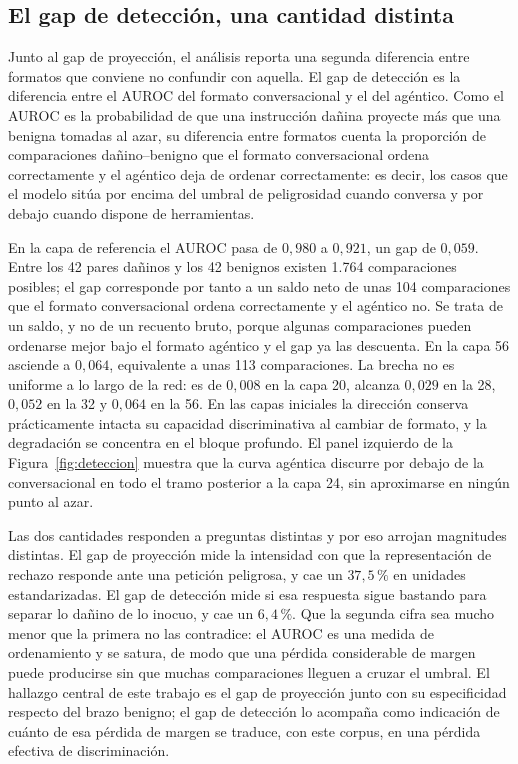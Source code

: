\documentclass[12pt,a4paper]{article}
\begin{document}
\subsection{El gap de detección, una cantidad distinta}

\justifying

Junto al gap de proyección, el análisis reporta una segunda diferencia entre formatos que conviene no confundir con aquella. El gap de detección es la diferencia entre el AUROC del formato conversacional y el del agéntico. Como el AUROC es la probabilidad de que una instrucción dañina proyecte más que una benigna tomadas al azar, su diferencia entre formatos cuenta la proporción de comparaciones dañino--benigno que el formato conversacional ordena correctamente y el agéntico deja de ordenar correctamente: es decir, los casos que el modelo sitúa por encima del umbral de peligrosidad cuando conversa y por debajo cuando dispone de herramientas.

En la capa de referencia el AUROC pasa de $0{,}980$ a $0{,}921$, un gap de $0{,}059$. Entre los 42 pares dañinos y los 42 benignos existen 1.764 comparaciones posibles; el gap corresponde por tanto a un saldo neto de unas 104 comparaciones que el formato conversacional ordena correctamente y el agéntico no. Se trata de un saldo, y no de un recuento bruto, porque algunas comparaciones pueden ordenarse mejor bajo el formato agéntico y el gap ya las descuenta. En la capa 56 asciende a $0{,}064$, equivalente a unas 113 comparaciones. La brecha no es uniforme a lo largo de la red: es de $0{,}008$ en la capa 20, alcanza $0{,}029$ en la 28, $0{,}052$ en la 32 y $0{,}064$ en la 56. En las capas iniciales la dirección conserva prácticamente intacta su capacidad discriminativa al cambiar de formato, y la degradación se concentra en el bloque profundo. El panel izquierdo de la Figura~\ref{fig:deteccion} muestra que la curva agéntica discurre por debajo de la conversacional en todo el tramo posterior a la capa 24, sin aproximarse en ningún punto al azar.

Las dos cantidades responden a preguntas distintas y por eso arrojan magnitudes distintas. El gap de proyección mide la intensidad con que la representación de rechazo responde ante una petición peligrosa, y cae un $37{,}5\,\%$ en unidades estandarizadas. El gap de detección mide si esa respuesta sigue bastando para separar lo dañino de lo inocuo, y cae un $6{,}4\,\%$. Que la segunda cifra sea mucho menor que la primera no las contradice: el AUROC es una medida de ordenamiento y se satura, de modo que una pérdida considerable de margen puede producirse sin que muchas comparaciones lleguen a cruzar el umbral. El hallazgo central de este trabajo es el gap de proyección junto con su especificidad respecto del brazo benigno; el gap de detección lo acompaña como indicación de cuánto de esa pérdida de margen se traduce, con este corpus, en una pérdida efectiva de discriminación.
\end{document}
